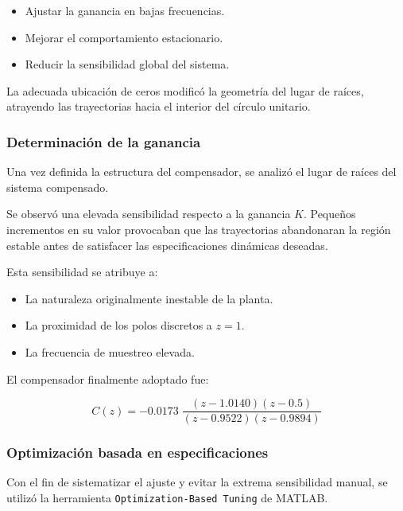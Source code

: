 \begin{itemize}
	\item Ajustar la ganancia en bajas frecuencias.
	\item Mejorar el comportamiento estacionario.
	\item Reducir la sensibilidad global del sistema.
\end{itemize}

La adecuada ubicación de ceros modificó la geometría del lugar de raíces, atrayendo las trayectorias hacia el interior del círculo unitario.

\subsubsection{Determinación de la ganancia}

Una vez definida la estructura del compensador, se analizó el lugar de raíces del sistema compensado.

Se observó una elevada sensibilidad respecto a la ganancia \(K\).  
Pequeños incrementos en su valor provocaban que las trayectorias abandonaran la región estable antes de satisfacer las especificaciones dinámicas deseadas.

Esta sensibilidad se atribuye a:

\begin{itemize}
	\item La naturaleza originalmente inestable de la planta.
	\item La proximidad de los polos discretos a \(z=1\).
	\item La frecuencia de muestreo elevada.
\end{itemize}

El compensador finalmente adoptado fue:

\begin{equation}
	C(z)=
	-0.0173 \;
	\frac{(z-1.0140)(z-0.5)}
	{(z-0.9522)(z-0.9894)}
\end{equation}

\subsubsection{Optimización basada en especificaciones}

Con el fin de sistematizar el ajuste y evitar la extrema sensibilidad manual, se utilizó la herramienta \texttt{Optimization-Based Tuning} de MATLAB.

